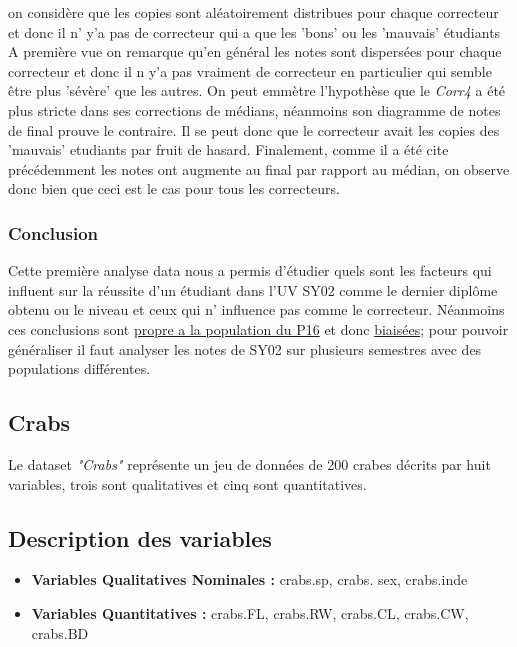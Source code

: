 \documentclass[10pt]{article}
\begin{document}
	on considère que les copies sont aléatoirement distribues pour chaque correcteur et donc il n' y'a pas de correcteur qui a que les 'bons' ou les 'mauvais' étudiants A première vue on remarque qu'en général les notes sont dispersées pour chaque correcteur et donc il n y'a pas vraiment de correcteur en particulier qui semble être plus 'sévère' que les autres. On peut emmètre l'hypothèse  que le \textit{Corr4} a été plus stricte dans ses corrections de médians, néanmoins son diagramme de notes de final prouve le contraire. Il se peut donc que le correcteur avait les copies des 'mauvais' etudiants par fruit de hasard. Finalement, comme il a été cite précédemment les notes ont augmente au final par rapport au médian, on observe donc bien que ceci est le cas pour tous les correcteurs.
	
	\subsubsection{Conclusion}
	Cette première analyse data nous a permis d'étudier  quels sont les facteurs qui influent sur la réussite d'un étudiant dans l'UV SY02 comme le dernier diplôme obtenu ou le niveau et ceux qui n' influence pas comme le correcteur. Néanmoins ces conclusions sont \underline{propre a la population du P16} et donc  \underline{biaisées}; pour pouvoir généraliser il faut analyser les notes de SY02 sur plusieurs semestres avec des populations différentes.
	
	\subsection{Crabs}
	Le dataset \textit{"Crabs"} représente un jeu de données de 200 crabes décrits par huit variables, trois sont qualitatives et cinq sont quantitatives.
	
	\subsection{Description des variables}
	
	
	\begin{itemize}
		\item \textbf{Variables Qualitatives Nominales :}  crabs.sp, crabs. sex, crabs.inde
		\item \textbf{Variables Quantitatives : } crabs.FL, crabs.RW, crabs.CL, crabs.CW, crabs.BD
	\end{itemize}
	
\end{document}
